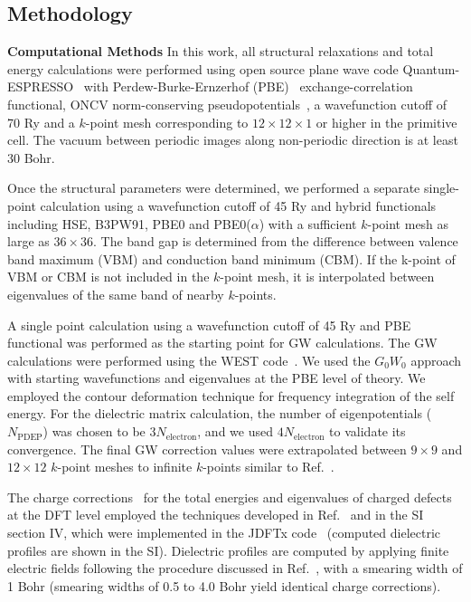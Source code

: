 
\subsection{Methodology}

\textbf{Computational Methods}
In this work, all structural relaxations and total energy calculations were performed using open source plane wave code Quantum-ESPRESSO~\cite{QE1} with Perdew-Burke-Ernzerhof (PBE)~\cite{perdew1996generalized} exchange-correlation functional, ONCV norm-conserving pseudopotentials~\cite{ONCV1,ONCV2}, a wavefunction cutoff of 70 Ry and a $k$-point mesh corresponding to $12\times12\times1$ or higher in the primitive cell. The vacuum between periodic images along non-periodic direction is at least 30 Bohr.

Once the structural parameters were determined, we performed a separate single-point calculation using a wavefunction cutoff of 45 Ry and hybrid functionals including HSE, B3PW91, PBE0 and PBE0($\alpha$) with a sufficient  $k$-point mesh as large as $36\times 36$.
The band gap is determined from the difference between valence band maximum (VBM) and conduction band minimum (CBM). If the k-point of VBM or CBM is not included in the $k$-point mesh, it is interpolated between eigenvalues of the same band of nearby $k$-points.

A single point calculation using a wavefunction cutoff of 45 Ry and PBE functional was performed as the starting point for GW calculations. The GW calculations were performed using the WEST code~\cite{govoni2015large}. We used the $G_0W_0$ approach with starting wavefunctions and eigenvalues at the PBE level of theory. We employed the contour deformation technique for frequency integration of the self energy. For the dielectric matrix calculation, the number of eigenpotentials ($N_{\textrm{PDEP}}$) was chosen to be  $3N_{\textrm{electron}}$, and we used $4N_{\textrm{electron}}$ to validate its convergence. The final GW correction values were extrapolated between $9\times 9$ and $12\times 12$ $k$-point meshes to infinite $k$-points similar to Ref.~\cite{wu2017first}.


The charge corrections~\cite{PING2017JCP} for the total energies and eigenvalues of charged defects at the DFT level employed the techniques developed in Ref.~\cite{PING2017JCP} and in the SI section IV, which were implemented in the JDFTx code~\cite{JDFTx,ismail2000new,arias1992ab} (computed dielectric profiles are shown in the SI). Dielectric profiles are computed by applying finite electric fields following the procedure discussed in Ref.~\cite{wu2017first}, with a smearing width of 1 Bohr (smearing widths of 0.5 to 4.0 Bohr yield  identical charge corrections).




